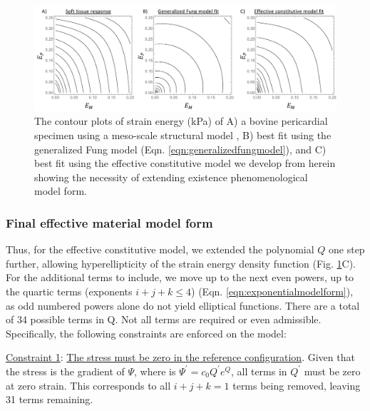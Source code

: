 \begin{figure}
\centering
\includegraphics[width=\textwidth]{Images/chapter5/strainenergycontours}
\caption{The contour plots of strain energy (kPa) of A) a bovine pericardial specimen using a meso-scale structural model \cite{zhang_modeling_2017}, B) best fit using the generalized Fung model (Eqn. \ref{eqn:generalizedfungmodel}), and C) best fit using the effective constitutive model we develop from herein showing the necessity of extending existence phenomenological model form.}
\label{fig:strainenergycontours}
\end{figure}

\subsubsection{Final effective material model form} \label{sec:finalform}

	Thus, for the effective constitutive model, we extended the polynomial $Q$ one step further, allowing hyperellipticity of the strain energy density function (Fig. \ref{fig:strainenergycontours}C). For the additional terms to include, we move up to the next even powers, up to the quartic terms (exponents $i+j+k\leq4$) (Eqn. \ref{eqn:exponentialmodelform}), as odd numbered powers alone do not yield elliptical functions. There are a total of 34 possible terms in Q. Not all terms are required or even admissible. Specifically, the following constraints are enforced on the model:
      
    \underline{Constraint 1}: \underline{The stress must be zero in the reference configuration}. Given that the stress is the gradient of $\Psi$, where is $\Psi^\prime = c_0 Q^\prime e^Q$, all terms in $Q^\prime$ must be zero at zero strain. This corresponds to all $i+j+k = 1$ terms being removed, leaving 31 terms remaining. 
      
